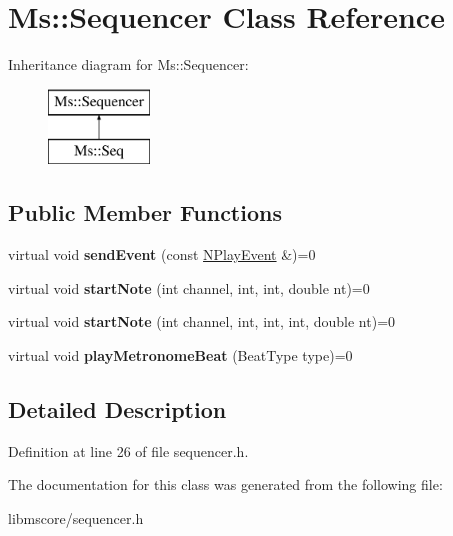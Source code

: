 \hypertarget{class_ms_1_1_sequencer}{}\section{Ms\+:\+:Sequencer Class Reference}
\label{class_ms_1_1_sequencer}
Inheritance diagram for Ms\+:\+:Sequencer\+:\begin{figure}[H]
\begin{center}
\leavevmode
\includegraphics[height=2.000000cm]{class_ms_1_1_sequencer}
\end{center}
\end{figure}
\subsection*{Public Member Functions}
\begin{DoxyCompactItemize}
\item 
\mbox{\label{class_ms_1_1_sequencer_a71b73a5f71693e7265c469e9090dcdce}} 
virtual void {\bfseries send\+Event} (const \hyperlink{class_ms_1_1_n_play_event}{N\+Play\+Event} \&)=0
\item 
\mbox{\label{class_ms_1_1_sequencer_ad1ab7579b6bf45c3a7bbdeff6a54a757}} 
virtual void {\bfseries start\+Note} (int channel, int, int, double nt)=0
\item 
\mbox{\label{class_ms_1_1_sequencer_a6de39d4cd2a3e24a72313fd3ae50f4af}} 
virtual void {\bfseries start\+Note} (int channel, int, int, int, double nt)=0
\item 
\mbox{\label{class_ms_1_1_sequencer_ae4374485fc1c8acbb52424cc547dd19f}} 
virtual void {\bfseries play\+Metronome\+Beat} (Beat\+Type type)=0
\end{DoxyCompactItemize}


\subsection{Detailed Description}


Definition at line 26 of file sequencer.\+h.



The documentation for this class was generated from the following file\+:\begin{DoxyCompactItemize}
\item 
libmscore/sequencer.\+h\end{DoxyCompactItemize}
